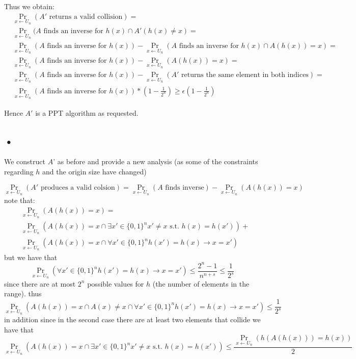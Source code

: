 \documentclass{article}
\begin{document}
Thus we obtain:
\begin{align*}
&\Pr_{x \leftarrow U_n}(A' \mbox{ returns a valid collision}) =\\
& \Pr_{x \leftarrow U_n}(A \mbox{ finds an inverse for } h(x) \cap A'(h(x) \neq x) = \\
&  \Pr_{x \leftarrow U_n}(A \mbox{ finds an inverse for } h(x)) -  \Pr_{x \leftarrow U_n}(A \mbox{ finds an inverse for } h(x) \cap A(h(x)) = x )=\\
&  \Pr_{x \leftarrow U_n}(A \mbox{ finds an inverse for } h(x)) -  \Pr_{x \leftarrow U_n}(A(h(x)) = x )=\\
 & \Pr_{x \leftarrow U_n}(A \mbox{ finds an inverse for } h(x)) - \Pr_{x \leftarrow U_n}(A'\mbox{ returns the same element in both indices}) =\\
 &  \Pr_{x \leftarrow U_n}(A \mbox{ finds an inverse for } h(x)) * (1-  \frac{1}{2^n})  \geq \epsilon(1-\frac{1}{2^n})
\end{align*}

Hence $A'$ is a PPT algorithm as requested.

\subsection{•}
We construct $A$' as before and provide a new analysis (as some of the constraints regarding $h$  and the origin size have changed)

\[\Pr_{x \leftarrow U_n}(A' \mbox{ produces a valid colsion}) = \Pr_{x \leftarrow U_n}(A \mbox{ finds inverse}) - \Pr_{x \leftarrow U_n}(A(h(x)) = x)\]
note that:
\begin{align*}
& \Pr_{x \leftarrow U_n}(A(h(x)) = x) = \\
&\Pr_{x \leftarrow U_n}(A(h(x)) = x \cap \exists x' \in \{0,1\}^n x' \neq x \mbox{ s.t. } h(x) = h(x')) +\\
& \Pr_{x \leftarrow U_n}(A(h(x)) = x \cap \forall x' \in \{0,1\}^n h(x') = h(x) \rightarrow x = x')
\end{align*}
but we have that 
\[\Pr_{x \leftarrow U_n}(\forall x' \in \{0,1\}^n h(x') = h(x) \rightarrow x = x') \leq \frac{2^n - 1}{n^{n+s}} \leq \frac{1}{2^s}\]
since there are at most $2^{n}$ possible values for $h$ (the number of elements in the range).
thus
\[ \Pr_{x \leftarrow U_n}(A(h(x)) = x \cap A(x) \neq x \cap \forall x' \in \{0,1\}^n h(x') = h(x) \rightarrow x = x') \leq \frac{1}{2^s}\]
in addition since in the second case there are at least two elements that collide we have that
\[\Pr_{x \leftarrow U_n}(A(h(x)) = x \cap \exists x' \in \{0,1\}^n x' \neq x \mbox{ s.t. } h(x) = h(x')) \leq \frac{\Pr_{x \leftarrow U_n}(h(A(h(x))) = h(x))}{2}\]
\end{document}
